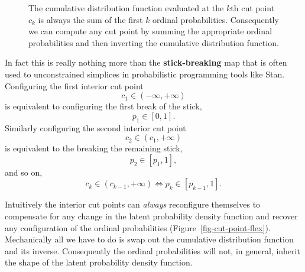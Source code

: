 \documentclass[
  letterpaper,
  DIV=11,
  numbers=noendperiod]{scrartcl}
\begin{document}
\begin{figure}


\caption{\label{fig-inverse}The cumulative distribution function
evaluated at the \(k\)th cut point \(c_{k}\) is always the sum of the
first \(k\) ordinal probabilities. Consequently we can compute any cut
point by summing the appropriate ordinal probabilities and then
inverting the cumulative distribution function.}

\end{figure}%

In fact this is really nothing more than the \textbf{stick-breaking} map
that is often used to unconstrained simplices in probabilistic
programming tools like Stan. Configuring the first interior cut point \[
c_{1} \in (-\infty, +\infty)
\] is equivalent to configuring the first break of the stick, \[
p_{1} \in [0, 1].
\] Similarly configuring the second interior cut point \[
c_{2} \in (c_{1}, +\infty)
\] is equivalent to the breaking the remaining stick, \[
p_{2} \in [ p_{1}, 1 ],
\] and so on, \[
c_{k} \in (c_{k - 1}, +\infty)
\Longleftrightarrow
p_{k} \in [p_{k - 1}, 1].
\]

Intuitively the interior cut points can \emph{always} reconfigure
themselves to compensate for any change in the latent probability
density function and recover any configuration of the ordinal
probabilities (Figure~\ref{fig-cut-point-flex}). Mechanically all we
have to do is swap out the cumulative distribution function and its
inverse. Consequently the ordinal probabilities will not, in general,
inherit the shape of the latent probability density function.
\end{document}
